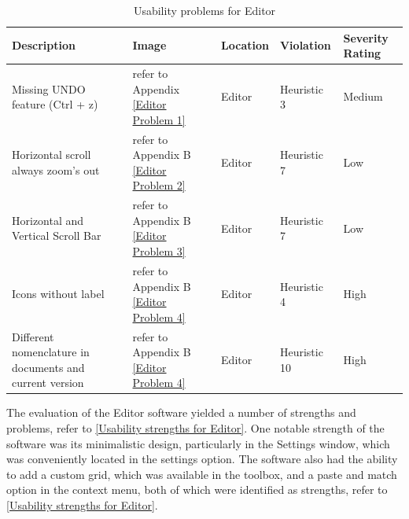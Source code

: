 \documentclass[conference,onecolumn]{IEEEtran}
\begin{document}
            \begin{table}[H]	
                \begin{center}
            \begin{tabular}[H]{ |m{7cm}|m{3cm}|m{2cm}|m{2cm}|m{2cm}|}
                        \hline
                        \textbf{Description}&\textbf{Image} &\textbf{Location} &\textbf{Violation} &\textbf{Severity Rating}  \\ \hline
                        Missing UNDO feature (Ctrl + z)	                            &refer to Appendix  \figurename{\ref{Editor Problem 1}} &Editor &Heuristic 3 &Medium  \\ \hline
                        Horizontal scroll always zoom's out 	                    &refer to Appendix B \figurename{\ref{Editor Problem 2}} &Editor &Heuristic 7 &Low  \\ \hline
                        Horizontal and Vertical Scroll Bar 	                        &refer to Appendix B \figurename{\ref{Editor Problem 3}} &Editor &Heuristic 7 &Low  \\ \hline
                        Icons without label 	                                    &refer to Appendix B \figurename{\ref{Editor Problem 4}} &Editor &Heuristic 4 &High   \\ \hline
                        Different nomenclature in documents and current version 	&refer to Appendix B \figurename{\ref{Editor Problem 4}} &Editor &Heuristic 10 &High   \\ 
                        \hline
                    \end{tabular}
                \end{center}
                \caption{Usability problems for Editor}
                \label{Usability problems for Editor}
            \end{table}

            The evaluation of the Editor software yielded a number of strengths and problems, refer to \tablename{ \ref{Usability strengths for Editor}}. One notable strength of the software was its minimalistic design, particularly in the Settings window, which was conveniently located in the settings option. The software also had the ability to add a custom grid, which was available in the toolbox, and a paste and match option in the context menu, both of which were identified as strengths, refer to \tablename{ \ref{Usability strengths for Editor}}.
\end{document}

